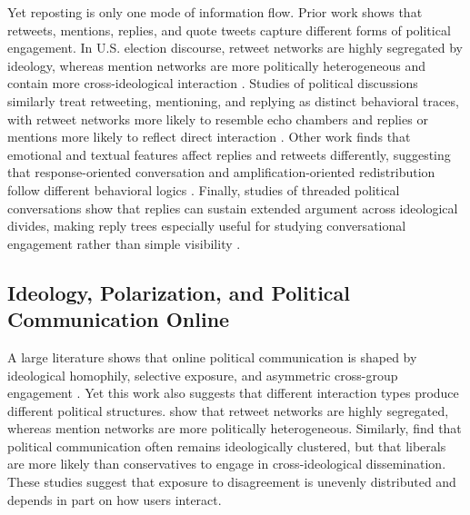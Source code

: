 \documentclass[letterpaper]{article} %
\begin{document}
Yet reposting is only one mode of information flow. Prior work shows that retweets, mentions, replies, and quote tweets capture different forms of political engagement. In U.S. election discourse, retweet networks are highly segregated by ideology, whereas mention networks are more politically heterogeneous and contain more cross-ideological interaction \cite{conover_political_2011}. Studies of political discussions similarly treat retweeting, mentioning, and replying as distinct behavioral traces, with retweet networks more likely to resemble echo chambers and replies or mentions more likely to reflect direct interaction \cite{guerrero_sole_interactive_2018}. Other work finds that emotional and textual features affect replies and retweets differently, suggesting that response-oriented conversation and amplification-oriented redistribution follow different behavioral logics \cite{kim_role_2012, toraman_understanding_2022}. Finally, studies of threaded political conversations show that replies can sustain extended argument across ideological divides, making reply trees especially useful for studying conversational engagement rather than simple visibility \cite{shugars_why_2019}.



\subsection{Ideology, Polarization, and Political Communication Online}


A large literature shows that online political communication is shaped by ideological homophily, selective exposure, and asymmetric cross-group engagement \cite{adamic_political_2005, conover_political_2011, flaxman_filter_2016, del_vicario_echo_2016}. Yet this work also suggests that different interaction types produce different political structures. \citet{conover_political_2011} show that retweet networks are highly segregated, whereas mention networks are more politically heterogeneous. Similarly, \citet{barbera_tweeting_2015} find that political communication often remains ideologically clustered, but that liberals are more likely than conservatives to engage in cross-ideological dissemination. These studies suggest that exposure to disagreement is unevenly distributed and depends in part on how users interact.
\end{document}
